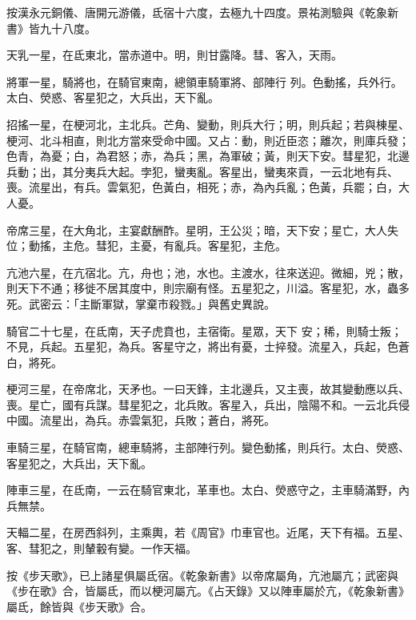 \begin{pinyinscope}
 按漢永元銅儀、唐開元游儀，氐宿十六度，去極九十四度。景祐測驗與《乾象新書》皆九十八度。



 天乳一星，在氐東北，當赤道中。明，則甘露降。彗、客入，天雨。



 將軍一星，騎將也，在騎官東南，總領車騎軍將、部陣行
 列。色動搖，兵外行。太白、熒惑、客星犯之，大兵出，天下亂。



 招搖一星，在梗河北，主北兵。芒角、變動，則兵大行；明，則兵起；若與棟星、梗河、北斗相直，則北方當來受命中國。又占：動，則近臣恣；離次，則庫兵發；色青，為憂；白，為君怒；赤，為兵；黑，為軍破；黃，則天下安。彗星犯，北邊兵動；出，其分夷兵大起。孛犯，蠻夷亂。客星出，蠻夷來貢，一云北地有兵、喪。流星出，有兵。雲氣犯，色黃白，相死；赤，為內兵亂；色黃，兵罷；白，大人憂。



 帝席三星，在大角北，主宴獻酬酢。星明，王公災；暗，天下安；星亡，大人失位；動搖，主危。彗犯，主憂，有亂兵。客星犯，主危。



 亢池六星，在亢宿北。亢，舟也；池，水也。主渡水，往來送迎。微細，兇；散，則天下不通；移徙不居其度中，則宗廟有怪。五星犯之，川溢。客星犯，水，蟲多死。武密云：「主斷軍獄，掌棄市殺戮。」與舊史異說。



 騎官二十七星，在氐南，天子虎賁也，主宿衛。星眾，天下
 安；稀，則騎士叛；不見，兵起。五星犯，為兵。客星守之，將出有憂，士捽發。流星入，兵起，色蒼白，將死。



 梗河三星，在帝席北，天矛也。一曰天鋒，主北邊兵，又主喪，故其變動應以兵、喪。星亡，國有兵謀。彗星犯之，北兵敗。客星入，兵出，陰陽不和。一云北兵侵中國。流星出，為兵。赤雲氣犯，兵敗；蒼白，將死。



 車騎三星，在騎官南，總車騎將，主部陣行列。變色動搖，則兵行。太白、熒惑、客星犯之，大兵出，天下亂。



 陣車三星，在氐南，一云在騎官東北，革車也。太白、熒惑守之，主車騎滿野，內兵無禁。



 天輻二星，在房西斜列，主乘輿，若《周官》巾車官也。近尾，天下有福。五星、客、彗犯之，則輦轂有變。一作天福。



 按《步天歌》，已上諸星俱屬氐宿。《乾象新書》以帝席屬角，亢池屬亢；武密與《步在歌》合，皆屬氐，而以梗河屬亢。《占天錄》又以陣車屬於亢，《乾象新書》屬氐，餘皆與《步天歌》合。




\end{pinyinscope}
